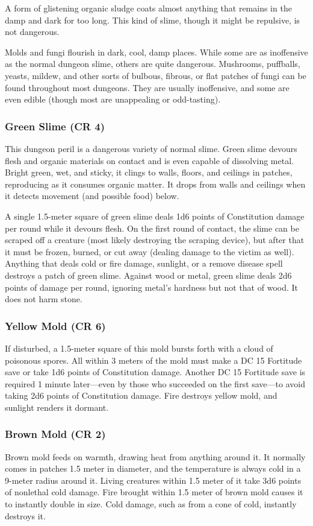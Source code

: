 A form of glistening organic sludge coats almost anything that remains in the damp and dark for too long. This kind of slime, though it might be repulsive, is not dangerous.

Molds and fungi flourish in dark, cool, damp places. While some are as inoffensive as the normal dungeon slime, others are quite dangerous. Mushrooms, puffballs, yeasts, mildew, and other sorts of bulbous, fibrous, or flat patches of fungi can be found throughout most dungeons. They are usually inoffensive, and some are even edible (though most are unappealing or odd-tasting).

\subsubsection{Green Slime (CR 4)}
This dungeon peril is a dangerous variety of normal slime. Green slime devours flesh and organic materials on contact and is even capable of dissolving metal. Bright green, wet, and sticky, it clings to walls, floors, and ceilings in patches, reproducing as it consumes organic matter. It drops from walls and ceilings when it detects movement (and possible food) below.

A single 1.5-meter square of green slime deals 1d6 points of Constitution damage per round while it devours flesh. On the first round of contact, the slime can be scraped off a creature (most likely destroying the scraping device), but after that it must be frozen, burned, or cut away (dealing damage to the victim as well). Anything that deals cold or fire damage, sunlight, or a remove disease spell destroys a patch of green slime. Against wood or metal, green slime deals 2d6 points of damage per round, ignoring metal's hardness but not that of wood. It does not harm stone.

\subsubsection{Yellow Mold (CR 6)}
If disturbed, a 1.5-meter square of this mold bursts forth with a cloud of poisonous spores. All within 3 meters of the mold must make a DC 15 Fortitude save or take 1d6 points of Constitution damage. Another DC 15 Fortitude save is required 1 minute later---even by those who succeeded on the first save---to avoid taking 2d6 points of Constitution damage. Fire destroys yellow mold, and sunlight renders it dormant.

\subsubsection{Brown Mold (CR 2)}
Brown mold feeds on warmth, drawing heat from anything around it. It normally comes in patches 1.5 meter in diameter, and the temperature is always cold in a 9-meter radius around it. Living creatures within 1.5 meter of it take 3d6 points of nonlethal cold damage. Fire brought within 1.5 meter of brown mold causes it to instantly double in size. Cold damage, such as from a cone of cold, instantly destroys it.

